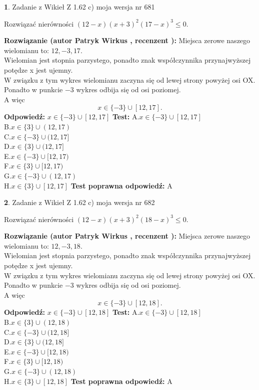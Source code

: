 \documentclass[12pt, a4paper]{article}
\theoremstyle{definition} %
\newtheorem{zad}{}
\newcommand{\zadStart}[1]{\begin{zad}#1\newline}
\newcommand{\zadStop}{\end{zad}}
\newcommand{\rozwStart}[2]{\noindent \textbf{Rozwiązanie (autor #1 , recenzent #2): }\newline}
\newcommand{\rozwStop}{\newline}
\newcommand{\odpStart}{\noindent \textbf{Odpowiedź:}\newline}
\newcommand{\odpStop}{\newline}
\newcommand{\testStart}{\noindent \textbf{Test:}\newline}
\newcommand{\testStop}{\newline}
\newcommand{\kluczStart}{\noindent \textbf{Test poprawna odpowiedź:}\newline}
\newcommand{\kluczStop}{\newline}
\begin{document}
\zadStart{Zadanie z Wikieł Z 1.62 c) moja wersja nr 681}

Rozwiązać nierówności $(12-x)(x+3)^{2}(17-x)^{3}\le0$.
\zadStop
\rozwStart{Patryk Wirkus}{}
Miejsca zerowe naszego wielomianu to: $12, -3, 17$.\\
Wielomian jest stopnia parzystego, ponadto znak współczynnika przy\linebreak najwyższej potędze x jest ujemny.\\ W związku z tym wykres wielomianu zaczyna się od lewej strony powyżej osi OX.\\
Ponadto w punkcie $-3$ wykres odbija się od osi poziomej.\\
A więc $$x \in \{-3\} \cup [12,17].$$
\rozwStop
\odpStart
$x \in \{-3\} \cup [12,17]$
\odpStop
\testStart
A.$x \in \{-3\} \cup [12,17]$\\
B.$x \in \{3\} \cup (12,17)$\\
C.$x \in \{-3\} \cup (12,17]$\\
D.$x \in \{3\} \cup (12,17]$\\
E.$x \in \{-3\} \cup [12,17)$\\
F.$x \in \{3\} \cup [12,17)$\\
G.$x \in \{-3\} \cup (12,17)$\\
H.$x \in \{3\} \cup [12,17]$
\testStop
\kluczStart
A
\kluczStop



\zadStart{Zadanie z Wikieł Z 1.62 c) moja wersja nr 682}

Rozwiązać nierówności $(12-x)(x+3)^{2}(18-x)^{3}\le0$.
\zadStop
\rozwStart{Patryk Wirkus}{}
Miejsca zerowe naszego wielomianu to: $12, -3, 18$.\\
Wielomian jest stopnia parzystego, ponadto znak współczynnika przy\linebreak najwyższej potędze x jest ujemny.\\ W związku z tym wykres wielomianu zaczyna się od lewej strony powyżej osi OX.\\
Ponadto w punkcie $-3$ wykres odbija się od osi poziomej.\\
A więc $$x \in \{-3\} \cup [12,18].$$
\rozwStop
\odpStart
$x \in \{-3\} \cup [12,18]$
\odpStop
\testStart
A.$x \in \{-3\} \cup [12,18]$\\
B.$x \in \{3\} \cup (12,18)$\\
C.$x \in \{-3\} \cup (12,18]$\\
D.$x \in \{3\} \cup (12,18]$\\
E.$x \in \{-3\} \cup [12,18)$\\
F.$x \in \{3\} \cup [12,18)$\\
G.$x \in \{-3\} \cup (12,18)$\\
H.$x \in \{3\} \cup [12,18]$
\testStop
\kluczStart
A
\kluczStop
\end{document}
